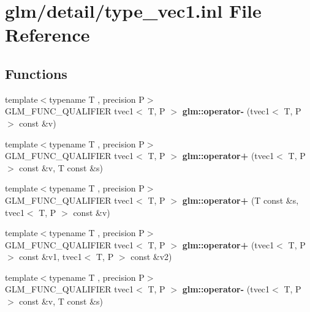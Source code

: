 \hypertarget{type__vec1_8inl}{\section{glm/detail/type\-\_\-vec1.inl File Reference}
\label{type__vec1_8inl}
}
\subsection*{Functions}
\begin{DoxyCompactItemize}
\item 
\hypertarget{namespaceglm_ac3f9c05afa9b75ec6fdfe03148300a1d}{{\footnotesize template$<$typename T , precision P$>$ }\\G\-L\-M\-\_\-\-F\-U\-N\-C\-\_\-\-Q\-U\-A\-L\-I\-F\-I\-E\-R tvec1$<$ T, P $>$ {\bfseries glm\-::operator-\/} (tvec1$<$ T, P $>$ const \&v)}\label{namespaceglm_ac3f9c05afa9b75ec6fdfe03148300a1d}

\item 
\hypertarget{namespaceglm_ace758e91210fcf554c28cba84c9546e1}{{\footnotesize template$<$typename T , precision P$>$ }\\G\-L\-M\-\_\-\-F\-U\-N\-C\-\_\-\-Q\-U\-A\-L\-I\-F\-I\-E\-R tvec1$<$ T, P $>$ {\bfseries glm\-::operator+} (tvec1$<$ T, P $>$ const \&v, T const \&s)}\label{namespaceglm_ace758e91210fcf554c28cba84c9546e1}

\item 
\hypertarget{namespaceglm_aae89ba82ecb696bdf0c979d25e5d54d3}{{\footnotesize template$<$typename T , precision P$>$ }\\G\-L\-M\-\_\-\-F\-U\-N\-C\-\_\-\-Q\-U\-A\-L\-I\-F\-I\-E\-R tvec1$<$ T, P $>$ {\bfseries glm\-::operator+} (T const \&s, tvec1$<$ T, P $>$ const \&v)}\label{namespaceglm_aae89ba82ecb696bdf0c979d25e5d54d3}

\item 
\hypertarget{namespaceglm_ae381e4d867bba4a184aea9bb1dd4032f}{{\footnotesize template$<$typename T , precision P$>$ }\\G\-L\-M\-\_\-\-F\-U\-N\-C\-\_\-\-Q\-U\-A\-L\-I\-F\-I\-E\-R tvec1$<$ T, P $>$ {\bfseries glm\-::operator+} (tvec1$<$ T, P $>$ const \&v1, tvec1$<$ T, P $>$ const \&v2)}\label{namespaceglm_ae381e4d867bba4a184aea9bb1dd4032f}

\item 
\hypertarget{namespaceglm_af2a9a5ed85cb00fad7e95c594a0deda9}{{\footnotesize template$<$typename T , precision P$>$ }\\G\-L\-M\-\_\-\-F\-U\-N\-C\-\_\-\-Q\-U\-A\-L\-I\-F\-I\-E\-R tvec1$<$ T, P $>$ {\bfseries glm\-::operator-\/} (tvec1$<$ T, P $>$ const \&v, T const \&s)}\label{namespaceglm_af2a9a5ed85cb00fad7e95c594a0deda9}


\end{DoxyCompactItemize}
